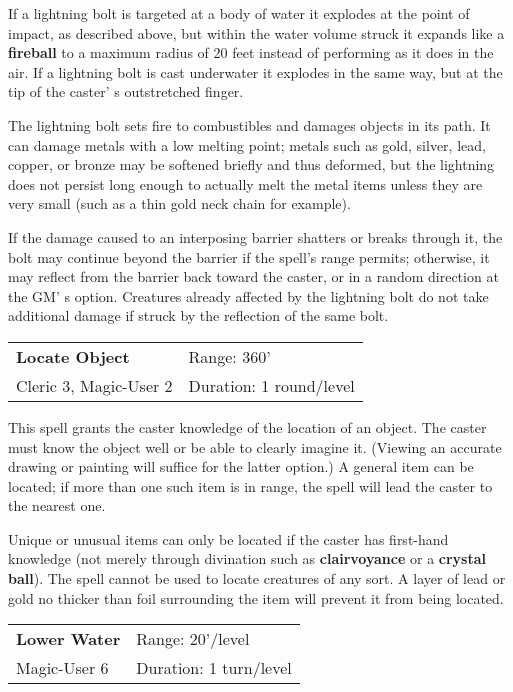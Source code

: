 \documentclass[a4paper,twoside,openany,10pt]{book}
\begin{document}
\begin{multicols}{2}
If a lightning bolt is targeted at a body of water it explodes at the point of impact, as described above, but within the water volume struck it expands like a \textbf{fireball} to a maximum radius of 20 feet instead of performing as it does in the air. If a lightning bolt is cast underwater it explodes in the same way, but at the tip of the caster' s outstretched finger.

The lightning bolt sets fire to combustibles and damages objects in its path. It can damage metals with a low melting point; metals such as gold, silver, lead, copper, or bronze may be softened briefly and thus deformed, but the lightning does not persist long enough to actually melt the metal items unless they are very small (such as a thin gold neck chain for example).

If the damage caused to an interposing barrier shatters or breaks through it, the bolt may continue beyond the barrier if the spell's range permits; otherwise, it may reflect from the barrier back toward the caster, or in a random direction at the GM' s option. Creatures already affected by the lightning bolt do not take additional damage if struck by the reflection of the same bolt.



\smallskip\begin{flushleft} 
	\begin{tabularx}{0.45\textwidth}{@{}m{3.5cm}m{5.5cm}@{}} 
		\textbf{Locate Object} & Range: 360'\\
Cleric 3, Magic-User 2 &Duration: 1 round/level\\
	\end{tabularx}\end{flushleft}

This spell grants the caster knowledge of the location of an object. The caster must know the object well or be able to clearly imagine it. (Viewing an accurate drawing or painting will suffice for the latter option.) A general item can be located; if more than one such item is in range, the spell will lead the caster to the nearest one.

Unique or unusual items can only be located if the caster has first-hand knowledge (not merely through divination such as \textbf{clairvoyance} or a \textbf{crystal ball}). The spell cannot be used to locate creatures of any sort. A layer of lead or gold no thicker than foil surrounding the item will prevent it from being located.


\smallskip\begin{flushleft} 
	\begin{tabularx}{0.45\textwidth}{@{}m{3.5cm}m{5.5cm}@{}} 
		\textbf{Lower Water} & Range: 20'/level\\
Magic-User 6 & Duration: 1 turn/level\\
	\end{tabularx}\end{flushleft}


\end{multicols}
\end{document}
